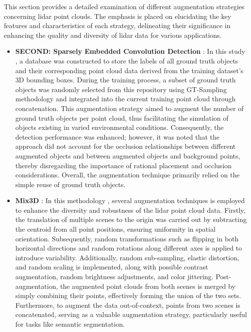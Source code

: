 This section provides a detailed examination of different augmentation strategies concerning lidar point clouds. The emphasis is placed on elucidating the key features and characteristics of each strategy, delineating their significance in enhancing the quality and diversity of lidar data for various applications. 
\begin{itemize}
    \item \textbf{SECOND: Sparsely Embedded Convolution Detection} : In this study \parencite{second2018}, a database was constructed to store the labels of all ground truth objects and their corresponding point cloud data derived from the training dataset's 3D bounding boxes. During the training process, a subset of ground truth objects was randomly selected from this repository using GT-Sampling methodology and integrated into the current training point cloud through concatenation. This augmentation strategy aimed to augment the number of ground truth objects per point cloud, thus facilitating the simulation of objects existing in varied environmental conditions. Consequently, the detection performance was enhanced; however, it was noted that the approach did not account for the occlusion relationships between different augmented objects and between augmented objects and background points, thereby disregarding the importance of rational placement and occlusion considerations. Overall, the augmentation technique primarily relied on the simple reuse of ground truth objects.
    \item \textbf{Mix3D} : In this methodology \parencite{mix3d2021}, several augmentation techniques is employed to enhance the diversity and robustness of the lidar point cloud data. Firstly, the translation of multiple scenes to the origin was carried out by subtracting the centroid from all point positions, ensuring uniformity in spatial orientation. Subsequently, random transformations such as flipping in both horizontal directions and random rotations along different axes is applied to introduce variability. Additionally, random sub-sampling, elastic distortion, and random scaling is implemented, along with possible contrast augmentation, random brightness adjustments, and color jittering. Post-augmentation, the augmented point clouds from both scenes is merged by simply combining their points, effectively forming the union of the two sets. Furthermore, to augment the data out-of-context, points from two scenes is concatenated, serving as a valuable augmentation strategy, particularly useful for tasks like semantic segmentation.

\end{itemize}
